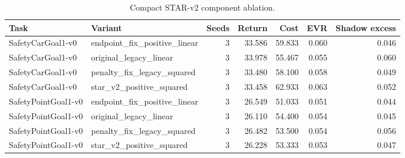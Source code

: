 \begin{table}[t]
\centering
\caption{Compact STAR-v2 component ablation.}
\label{tab:star-v2-ablation}
\begin{tabular}{llrrrrr}
\toprule
Task & Variant & Seeds & Return & Cost & EVR & Shadow excess \\
\midrule
SafetyCarGoal1-v0 & endpoint\_fix\_positive\_linear & 3 & 33.586 & 59.833 & 0.060 & 0.046 \\
SafetyCarGoal1-v0 & original\_legacy\_linear & 3 & 33.978 & 55.467 & 0.055 & 0.060 \\
SafetyCarGoal1-v0 & penalty\_fix\_legacy\_squared & 3 & 33.480 & 58.100 & 0.058 & 0.049 \\
SafetyCarGoal1-v0 & star\_v2\_positive\_squared & 3 & 33.458 & 62.933 & 0.063 & 0.052 \\
SafetyPointGoal1-v0 & endpoint\_fix\_positive\_linear & 3 & 26.549 & 51.033 & 0.051 & 0.044 \\
SafetyPointGoal1-v0 & original\_legacy\_linear & 3 & 26.110 & 54.400 & 0.054 & 0.045 \\
SafetyPointGoal1-v0 & penalty\_fix\_legacy\_squared & 3 & 26.482 & 53.500 & 0.054 & 0.056 \\
SafetyPointGoal1-v0 & star\_v2\_positive\_squared & 3 & 26.228 & 53.333 & 0.053 & 0.047 \\
\bottomrule
\end{tabular}
\end{table}

